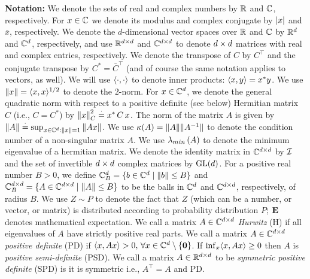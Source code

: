 \textbf{Notation:} We denote the sets of real and complex numbers by $\mathbb{R}$ and $\mathbb{C}$, respectively. For $x\in \mathbb{C}$ we denote its modulus and complex conjugate by $\left|x\right|$ and $\bar{x}$, respectively. We denote the $d$-dimensional vector spaces over $\mathbb{R}$ and $\mathbb{C}$ by $\mathbb{R}^{d}$ and $\mathbb{C}^{d}$, respectively, and use $\mathbb{R}^{d \times d}$ and $\mathbb{C}^{d \times d}$ to denote $d \times d$ matrices with real and complex entries, respectively. We denote the transpose of $C$ by $C^\top$ and the conjugate transpose by $C^*={\bar{C}}^\top$ (and of course the same notation applies to vectors, as well). We will use $\langle\cdot,\cdot\rangle$ to denote inner products: $\langle x,y\rangle=x^* y$. 
We use $\left\| x\right\| = \langle x,x\rangle^{1/2}$ to denote the $2$-norm.
For $x\in\mathbb{C}^d$, we denote the general quadratic norm with respect to a positive definite (see below) Hermitian matrix $C$ (i.e., $C=C^*$) by $\left\| x\right\|^2_C\stackrel{\cdot}{=} x^*\, C \,x$.
The norm of the matrix $A$ is given by $\left\| A\right\|\stackrel{\cdot}{=} \sup_{x\in \mathbb{C}^d:\left\| x\right\|=1} \left\| Ax\right\|$.  We use $\kappa(A)=\| A\|\| A^{-1}\|$ to denote the condition number of a non-singular matrix $A$. We use $\lambda_{min}\left(A\right)$ to denote the minimum eigenvalue of a hermitian matrix.
We denote the identity matrix in $\mathbb{C}^{d \times d}$ by $\mathcal{I}$ and the set of invertible $d \times d$ complex matrices by $\mathrm{GL}(d)$.
For a positive real number $B>0$, we define $\mathbb{C}^{d}_B=\{b\in \mathbb{C}^d\mid \left\| b\right\|\leq B\}$ and $\mathbb{C}^{d \times d}_B=\{A\in \mathbb{C}^{d \times d}\mid \left\| A\right\|\leq B\}$ to be the balls in $\mathbb{C}^d$ and $\mathbb{C}^{d\times d}$, respectively, of radius $B$. We use $Z\sim P$ to denote the fact that $Z$ (which can be a number, or vector, or matrix) is distributed according to probability distribution $P$; $\mathbf{E}$ denotes mathematical expectation. We call a matrix $A\in \mathbb{C}^{d \times d}$  \emph{Hurwitz} (H) if all eigenvalues of $A$ have strictly positive real parts. We call a matrix $A\in \mathbb{C}^{d \times d}$ \emph{positive definite} (PD) if $\langle x,Ax\rangle >0,\,\forall x \in \mathbb{C}^{d}\setminus\{\mathbf{0}\}$.  
If $\inf_x \langle x,Ax\rangle\ge 0$ then $A$ is \emph{positive semi-definite} (PSD).
We call a matrix $A\in \mathbb{R}^{d \times d}$ to be \emph{symmetric positive definite} (SPD) is it is symmetric i.e., $A^\top=A$ and PD. 
